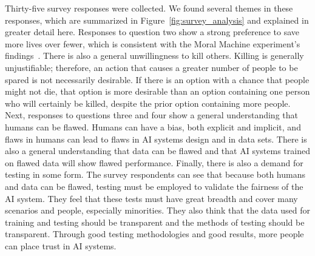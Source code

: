 \documentclass[paper=a4paper]{report}
\begin{document}
Thirty-five survey responses were collected. We found several themes in these responses, which are
summarized in Figure~\ref{fig:survey_analysis} and explained in greater detail here. Responses to
question two show a strong preference to save more lives over fewer, which is consistent with the
Moral Machine experiment's findings~\cite{awad2018moral}. There is also a general unwillingness to
kill others. Killing is generally unjustifiable; therefore, an action that causes a greater number
of people to be spared is not necessarily desirable. If there is an option with a chance that people
might not die, that option is more desirable than an option containing one person who will certainly
be killed, despite the prior option containing more people. Next, responses to questions three and
four show a general understanding that humans can be flawed. Humans can have a bias, both explicit
and implicit, and flaws in humans can lead to flaws in AI systems design and in data sets. There is
also a general understanding that data can be flawed and that AI systems trained on flawed data will
show flawed performance. Finally, there is also a demand for testing in some form. The survey
respondents can see that because both humans and data can be flawed, testing must be employed to
validate the fairness of the AI system. They feel that these tests must have great breadth and cover
many scenarios and people, especially minorities. They also think that the data used for training
and testing should be transparent and the methods of testing should be transparent. Through good
testing methodologies and good results, more people can place trust in AI systems.
\end{document}
